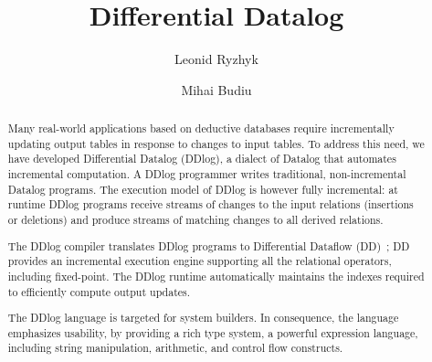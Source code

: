 \documentclass{svproc}
\author{
        Leonid Ryzhyk \and
        Mihai Budiu}
\institute{VMware Research}
\title{Differential Datalog}
\date{}
\begin{document}
\maketitle

\begin{abstract}

Many real-world applications based on deductive databases require
incrementally updating output tables in response to changes to input
tables.  To address this need, we have developed Differential Datalog
(DDlog), a dialect of Datalog that automates incremental computation.
A DDlog programmer writes traditional, non-incremental Datalog
programs.  The execution model of DDlog is however fully incremental:
at runtime DDlog programs receive streams of changes to the input
relations (insertions or deletions) and produce streams of matching
changes to all derived relations.

The DDlog compiler translates DDlog programs to Differential Dataflow
(DD)~\cite{differential-dataflow-paper}; DD provides an incremental
execution engine supporting all the relational operators, including
fixed-point.  The DDlog runtime automatically maintains the indexes
required to efficiently compute output updates.

The DDlog language is targeted for system builders.  In consequence,
the language emphasizes usability, by providing a rich type system, a
powerful expression language, including string manipulation,
arithmetic, and control flow constructs.
\end{abstract}










\end{document}
